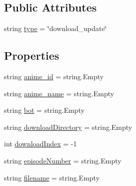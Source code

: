 \subsection*{Public Attributes}
\begin{DoxyCompactItemize}
\item 
string \mbox{\hyperlink{class_little_weeb_library_1_1_models_1_1_json_download_info_a4c31eb2a79dc5e0d239b493c3e8dd866}{type}} = \char`\"{}download\+\_\+update\char`\"{}
\end{DoxyCompactItemize}
\subsection*{Properties}
\begin{DoxyCompactItemize}
\item 
string \mbox{\hyperlink{class_little_weeb_library_1_1_models_1_1_json_download_info_a544452b6bde1433070fb088af297cc12}{anime\+\_\+id}} = string.\+Empty
\item 
string \mbox{\hyperlink{class_little_weeb_library_1_1_models_1_1_json_download_info_a27d95ac59e5a4bf7f68421e9ea0036db}{anime\+\_\+name}} = string.\+Empty
\item 
string \mbox{\hyperlink{class_little_weeb_library_1_1_models_1_1_json_download_info_a0c8281bcd1f8766ddc86d89f0dc1b23c}{bot}} = string.\+Empty
\item 
string \mbox{\hyperlink{class_little_weeb_library_1_1_models_1_1_json_download_info_af04b1b815de21ea578f039ecc0e2957b}{download\+Directory}} = string.\+Empty
\item 
int \mbox{\hyperlink{class_little_weeb_library_1_1_models_1_1_json_download_info_a25aeccc063b602b3d6576f12a9a1b1df}{download\+Index}} = -\/1
\item 
string \mbox{\hyperlink{class_little_weeb_library_1_1_models_1_1_json_download_info_a8ea2c1b9bb90ff75af38c6afa8f0bc14}{episode\+Number}} = string.\+Empty
\item 
string \mbox{\hyperlink{class_little_weeb_library_1_1_models_1_1_json_download_info_a1d7135715feead09b5ace2b3b67fce4a}{filename}} = string.\+Empty

\end{DoxyCompactItemize}
